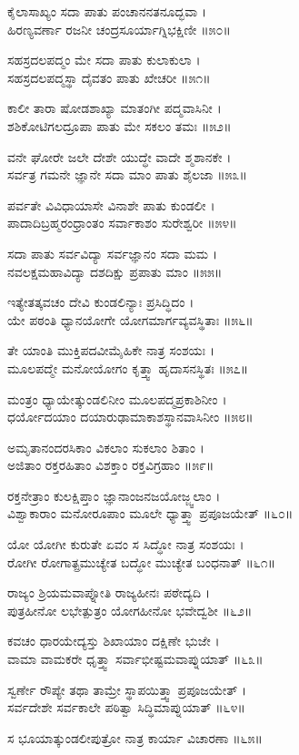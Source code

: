 ಕೈಲಾಸಾಖ್ಯಂ ಸದಾ ಪಾತು ಪಂಚಾನನತನೂದ್ಭವಾ ।\\
ಹಿರಣ್ಯವರ್ಣಾ ರಜನೀ ಚಂದ್ರಸೂರ್ಯಾಗ್ನಿಭಕ್ಷಿಣೀ ॥೫೦॥

ಸಹಸ್ರದಲಪದ್ಮಂ ಮೇ ಸದಾ ಪಾತು ಕುಲಾಕುಲಾ ।\\
ಸಹಸ್ರದಲಪದ್ಮಸ್ಥಾ ದೈವತಂ ಪಾತು ಖೇಚರೀ ॥೫೧॥

ಕಾಲೀ ತಾರಾ ಷೋಡಶಾಖ್ಯಾ ಮಾತಂಗೀ ಪದ್ಮವಾಸಿನೀ ।\\
ಶಶಿಕೋಟಿಗಲದ್ರೂಪಾ ಪಾತು ಮೇ ಸಕಲಂ ತಮಃ ॥೫೨॥

ವನೇ ಘೋರೇ ಜಲೇ ದೇಶೇ ಯುದ್ಧೇ ವಾದೇ ಶ್ಮಶಾನಕೇ ।\\
ಸರ್ವತ್ರ ಗಮನೇ ಜ್ಞಾನೇ ಸದಾ ಮಾಂ ಪಾತು ಶೈಲಜಾ ॥೫೩॥

ಪರ್ವತೇ ವಿವಿಧಾಯಾಸೇ ವಿನಾಶೇ ಪಾತು ಕುಂಡಲೀ ।\\
ಪಾದಾದಿಬ್ರಹ್ಮರಂಧ್ರಾಂತಂ ಸರ್ವಾಕಾಶಂ ಸುರೇಶ್ವರೀ ॥೫೪॥

ಸದಾ ಪಾತು ಸರ್ವವಿದ್ಯಾ ಸರ್ವಜ್ಞಾನಂ ಸದಾ ಮಮ ।\\
ನವಲಕ್ಷಮಹಾವಿದ್ಯಾ ದಶದಿಕ್ಷು ಪ್ರಪಾತು ಮಾಂ ॥೫೫॥

ಇತ್ಯೇತತ್ಕವಚಂ ದೇವಿ ಕುಂಡಲಿನ್ಯಾಃ ಪ್ರಸಿದ್ಧಿದಂ ।\\
ಯೇ ಪಠಂತಿ ಧ್ಯಾನಯೋಗೇ ಯೋಗಮಾರ್ಗವ್ಯವಸ್ಥಿತಾಃ ॥೫೬॥

ತೇ ಯಾಂತಿ ಮುಕ್ತಿಪದವೀಮೈಹಿಕೇ ನಾತ್ರ ಸಂಶಯಃ ।\\
ಮೂಲಪದ್ಮೇ ಮನೋಯೋಗಂ ಕೃತ್ತ್ವಾ ಹೃದಾಸನಸ್ಥಿತಃ ॥೫೭॥

ಮಂತ್ರಂ ಧ್ಯಾಯೇತ್ಕುಂಡಲಿನೀಂ ಮೂಲಪದ್ಮಪ್ರಕಾಶಿನೀಂ ।\\
ಧರ್ಯೋದಯಾಂ ದಯಾರುಢಾಮಾಕಾಶಸ್ಥಾನವಾಸಿನೀಂ ॥೫೮॥

ಅಮೃತಾನಂದರಸಿಕಾಂ ವಿಕಲಾಂ ಸುಕಲಾಂ ಶಿತಾಂ ।\\
ಅಜಿತಾಂ ರಕ್ತರಹಿತಾಂ ವಿಶಕ್ತಾಂ ರಕ್ತವಿಗ್ರಹಾಂ ॥೫೯॥

ರಕ್ತನೇತ್ರಾಂ ಕುಲಕ್ಷಿಪ್ತಾಂ ಜ್ಞಾನಾಂಜನಜಯೋಜ್ಜ್ವಲಾಂ ।\\
ವಿಶ್ವಾಕಾರಾಂ ಮನೋರೂಪಾಂ ಮೂಲೇ ಧ್ಯಾತ್ತ್ವಾ ಪ್ರಪೂಜಯೇತ್ ॥೬೦॥

ಯೋ ಯೋಗೀ ಕುರುತೇ ಏವಂ ಸ ಸಿದ್ಧೋ ನಾತ್ರ ಸಂಶಯಃ ।\\
ರೋಗೀ ರೋಗಾತ್ಪ್ರಮುಚ್ಯೇತ ಬದ್ಧೋ ಮುಚ್ಯೇತ ಬಂಧನಾತ್ ॥೬೧॥

ರಾಜ್ಯಂ ಶ್ರಿಯಮವಾಪ್ನೋತಿ ರಾಜ್ಯಹೀನಃ ಪಠೇದ್ಯದಿ ।\\
ಪುತ್ರಹೀನೋ ಲಭೇತ್ಪುತ್ರಂ ಯೋಗಹೀನೋ ಭವೇದ್ವಶೀ ॥೬೨॥

ಕವಚಂ ಧಾರಯೇದ್ಯಸ್ತು ಶಿಖಾಯಾಂ ದಕ್ಷಿಣೇ ಭುಜೇ ।\\
ವಾಮಾ ವಾಮಕರೇ ಧೃತ್ತ್ವಾ ಸರ್ವಾಭೀಷ್ಟಮವಾಪ್ನುಯಾತ್ ॥೬೩॥

ಸ್ವರ್ಣೇ ರೌಪ್ಯೇ ತಥಾ ತಾಮ್ರೇ ಸ್ಥಾಪಯಿತ್ತ್ವಾ ಪ್ರಪೂಜಯೇತ್ ।\\
ಸರ್ವದೇಶೇ ಸರ್ವಕಾಲೇ ಪಠಿತ್ವಾ ಸಿದ್ಧಿಮಾಪ್ನುಯಾತ್ ॥೬೪॥

ಸ ಭೂಯಾತ್ಕುಂಡಲೀಪುತ್ರೋ ನಾತ್ರ ಕಾರ್ಯಾ ವಿಚಾರಣಾ ॥೬೫॥

